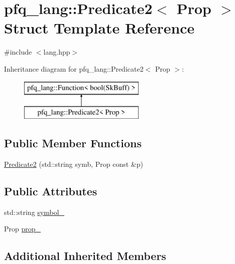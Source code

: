 \hypertarget{structpfq__lang_1_1Predicate2}{\section{pfq\+\_\+lang\+:\+:Predicate2$<$ Prop $>$ Struct Template Reference}
\label{structpfq__lang_1_1Predicate2}
}


{\ttfamily \#include $<$lang.\+hpp$>$}

Inheritance diagram for pfq\+\_\+lang\+:\+:Predicate2$<$ Prop $>$\+:\begin{figure}[H]
\begin{center}
\leavevmode
\includegraphics[height=2.000000cm]{structpfq__lang_1_1Predicate2}
\end{center}
\end{figure}
\subsection*{Public Member Functions}
\begin{DoxyCompactItemize}
\item 
\hyperlink{structpfq__lang_1_1Predicate2_a679505645d9410abe961cc4e51aff0c4}{Predicate2} (std\+::string symb, Prop const \&p)
\end{DoxyCompactItemize}
\subsection*{Public Attributes}
\begin{DoxyCompactItemize}
\item 
std\+::string \hyperlink{structpfq__lang_1_1Predicate2_a4e35998af857cdc5da3a515009fb8247}{symbol\+\_\+}
\item 
Prop \hyperlink{structpfq__lang_1_1Predicate2_af3f7dcc4db7db8e2b0dc610b21966224}{prop\+\_\+}
\end{DoxyCompactItemize}
\subsection*{Additional Inherited Members}


